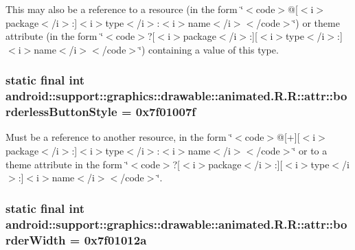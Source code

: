 This may also be a reference to a resource (in the form \char`\"{}$<$code$>$@\mbox{[}$<$i$>$package$<$/i$>$:\mbox{]}$<$i$>$type$<$/i$>$:$<$i$>$name$<$/i$>$$<$/code$>$\char`\"{}) or theme attribute (in the form \char`\"{}$<$code$>$?\mbox{[}$<$i$>$package$<$/i$>$:\mbox{]}\mbox{[}$<$i$>$type$<$/i$>$:\mbox{]}$<$i$>$name$<$/i$>$$<$/code$>$\char`\"{}) containing a value of this type. \hypertarget{classandroid_1_1support_1_1graphics_1_1drawable_1_1animated_1_1_r_1_1attr_a51d6a1e8c287a4df281a6b8fe0ffdb8}{
\subsubsection[{borderlessButtonStyle}]{\setlength{\rightskip}{0pt plus 5cm}static final int android::support::graphics::drawable::animated.R.R::attr::borderlessButtonStyle = 0x7f01007f}}
\label{classandroid_1_1support_1_1graphics_1_1drawable_1_1animated_1_1_r_1_1attr_a51d6a1e8c287a4df281a6b8fe0ffdb8}


Must be a reference to another resource, in the form \char`\"{}$<$code$>$@\mbox{[}+\mbox{]}\mbox{[}$<$i$>$package$<$/i$>$:\mbox{]}$<$i$>$type$<$/i$>$:$<$i$>$name$<$/i$>$$<$/code$>$\char`\"{} or to a theme attribute in the form \char`\"{}$<$code$>$?\mbox{[}$<$i$>$package$<$/i$>$:\mbox{]}\mbox{[}$<$i$>$type$<$/i$>$:\mbox{]}$<$i$>$name$<$/i$>$$<$/code$>$\char`\"{}. \hypertarget{classandroid_1_1support_1_1graphics_1_1drawable_1_1animated_1_1_r_1_1attr_b0062829e23e328beaca71a5910c9588}{
\subsubsection[{borderWidth}]{\setlength{\rightskip}{0pt plus 5cm}static final int android::support::graphics::drawable::animated.R.R::attr::borderWidth = 0x7f01012a}}
\label{classandroid_1_1support_1_1graphics_1_1drawable_1_1animated_1_1_r_1_1attr_b0062829e23e328beaca71a5910c9588}


